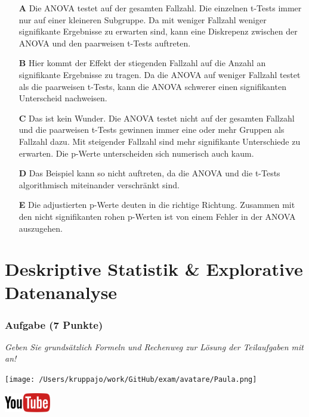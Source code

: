 \documentclass[a4paper, 9pt]{scrartcl}\usepackage[]{graphicx}\usepackage[]{xcolor}
\begin{document}
\begin{enumerate}
\item [\textbf{A} \msquare] Die ANOVA testet auf der gesamten Fallzahl. Die einzelnen t-Tests immer nur auf einer kleineren Subgruppe. Da mit weniger Fallzahl weniger signifikante Ergebnisse zu erwarten sind, kann eine Diskrepenz zwischen der ANOVA und den paarweisen t-Tests auftreten.
\item [\textbf{B} \msquare] Hier kommt der Effekt der stiegenden Fallzahl auf die Anzahl an signifikante Ergebnisse zu tragen. Da die ANOVA auf weniger Fallzahl testet als die paarweisen t-Tests, kann die ANOVA schwerer einen signifikanten Unterscheid nachweisen.
\item [\textbf{C} \msquare] Das ist kein Wunder. Die ANOVA testet nicht auf der gesamten Fallzahl und die paarweisen t-Tests gewinnen immer eine oder mehr Gruppen als Fallzahl dazu. Mit steigender Fallzahl sind mehr signifikante Unterschiede zu erwarten. Die p-Werte unterscheiden sich numerisch auch kaum.
\item [\textbf{D} \msquare] Das Beispiel kann so nicht auftreten, da die ANOVA und die t-Tests algorithmisch miteinander verschränkt sind.
\item [\textbf{E} \msquare] Die adjustierten p-Werte deuten in die richtige Richtung. Zusammen mit den nicht signifikanten rohen p-Werten ist von einem Fehler in der ANOVA auszugehen.
\end{enumerate}
    
\clearpage
\part{Deskriptive Statistik \& Explorative Datenanalyse}

\section{Aufgabe \hfill (7 Punkte)}

\textit{Geben Sie grundsätzlich Formeln und Rechenweg zur Lösung der Teilaufgaben mit an!} \\[1Ex]
 

 
\begin{minipage}[t]{0.5\textwidth}
\texttt{[image: /Users/kruppajo/work/GitHub/exam/avatare/Paula.png]}
\end{minipage}
\begin{minipage}[t]{0.5\textwidth}
\hfill
\href{https://youtu.be/t0WYa_LVc5o}{\includegraphics[width = 2cm]{img/youtube}}\\[1Ex]
\end{minipage}
\vspace{1ex}
\end{document}
